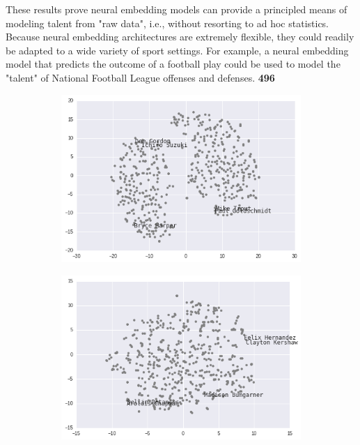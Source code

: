 \documentclass{article}
\begin{document}
These results prove neural embedding models can provide a principled means of modeling talent from "raw data", i.e., without resorting to ad hoc statistics. Because neural embedding architectures are extremely flexible, they could readily be adapted to a wide variety of sport settings. For example, a neural embedding model that predicts the outcome of a football play could be used to model the "talent" of National Football League offenses and defenses. \textbf{496}

\begin{figure}[h]
\centering
\begin{minipage}{.5\textwidth}
\captionsetup[subfigure]{labelformat=empty}
\centering

    \begin{subfigure}[b]{0.75\textwidth}
    \includegraphics[width=1\linewidth]{batter_tsne.png}
    \caption{}
    \end{subfigure}

    \begin{subfigure}[b]{0.75\textwidth}
    \includegraphics[width=1\linewidth]{pitcher_tsne.png}
    \caption{}
    \end{subfigure}


\end{minipage}
\end{figure}
\end{document}

